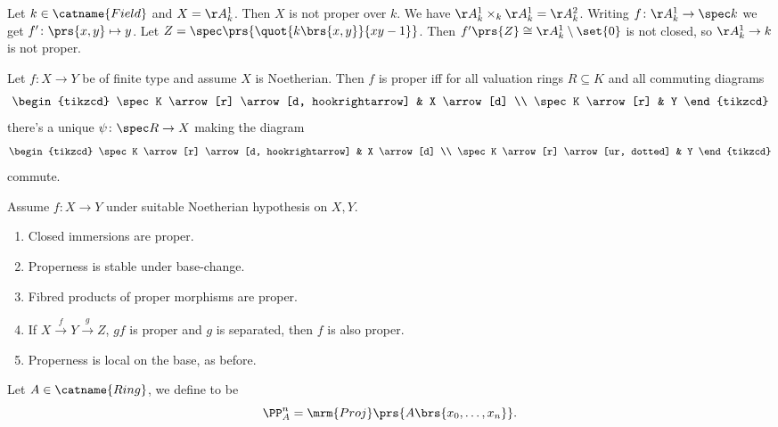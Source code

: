 \documentclass[10pt,a4paper,twoside,openany,hidelinks]{book}
\begin{document}
\begin{example}
Let $k \in \catname{Field}$ and $X = \AA_k^1$. Then $X$ is not proper over $k$.
We have $\AA_k^1 \times_k \AA_k^1 = \AA_k^2$. Writing $f \colon \AA_k^1 \to \spec k$ we get $f' \colon \prs{x,y} \mapsto y$. Let $Z = \spec\prs{\quot{k\brs{x,y}}{xy-1}}$.
Then $f'\prs{Z} \cong \AA_k^1 \setminus \set{0}$ is not closed, so $\AA_k^1 \to k$ is not proper.
\end{example}

\begin{theorem}
Let $f \colon X \to Y$ be of finite type and assume $X$ is Noetherian. Then $f$ is proper iff for all valuation rings $R \subseteq K$ and all commuting diagrams
$$
\begin{tikzcd}
\spec K \arrow[r] \arrow[d, hookrightarrow] & X \arrow[d] \\ \spec K \arrow[r] & Y
\end{tikzcd}
$$
there's a unique $\psi \colon \spec R \to X$ making the diagram
$$
\begin{tikzcd}
\spec K \arrow[r] \arrow[d, hookrightarrow] & X \arrow[d] \\ \spec K \arrow[r] \arrow[ur, dotted] & Y
\end{tikzcd}
$$
commute.
\end{theorem}

\begin{corollary}
Assume $f \colon X \to Y$ under suitable Noetherian hypothesis on $X,Y$.
\begin{enumerate}
    \item Closed immersions are proper.
    \item Properness is stable under base-change.
    \item Fibred products of proper morphisms are proper.
    \item If $X \xrightarrow{f} Y \xrightarrow{g} Z$, $gf$ is proper and $g$ is separated, then $f$ is also proper.
    \item Properness is local on the base, as before.
\end{enumerate}
\end{corollary}

\begin{definition}
Let $A \in \catname{Ring}$, we define  to be
$$\PP_A^n = \mrm{Proj}\prs{A \brs{x_0, \ldots, x_n}} \text{.}$$
\end{definition}
\end{document}
